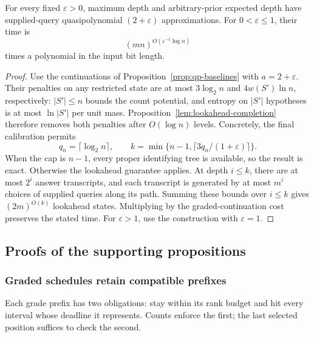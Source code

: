 \begin{theorem}\label{thm:qp-two-plus-epsilon}
For every fixed $\varepsilon>0$, maximum depth and
arbitrary-prior expected depth have supplied-query quasipolynomial
$(2+\varepsilon)$ approximations. For $0<\varepsilon\le1$, their time is
\[
(mn)^{O(\varepsilon^{-1}\log n)}
\]
times a polynomial in the
input bit length.
\end{theorem}
\begin{proof}
Use the continuations of Proposition~\ref{prop:qp-baselines} with
$a=2+\varepsilon$. Their penalties on any restricted state are at
most $3\log_2n$ and $4w(S')\ln n$, respectively: $|S'|\le n$
bounds the count potential, and entropy on $|S'|$ hypotheses is at
most $\ln|S'|$ per unit mass. Proposition~\ref{lem:lookahead-completion}
therefore removes both penalties after $O(\log n)$ levels. Concretely, the
final calibration permits
\[
 q_n=\lceil\log_2n\rceil,\qquad
 k=\min\{n-1,\lceil3q_n/(1+\varepsilon)\rceil\}.
\]
When the cap is $n-1$, every proper identifying tree is available,
so the result is exact. Otherwise the lookahead guarantee applies.
At depth $i\le k$, there are at most $2^i$ answer transcripts, and
each transcript is generated by at most $m^i$ choices of supplied
queries along its path. Summing these bounds over $i\le k$ gives
$(2m)^{O(k)}$ lookahead states. Multiplying by the graded-continuation
cost preserves the stated time. For
$\varepsilon>1$, use the construction with $\varepsilon=1$.
\end{proof}

\subsection{Proofs of the supporting propositions}

\subsubsection{Graded schedules retain compatible prefixes}

Each grade prefix has two obligations: stay within its rank budget and
hit every interval whose deadline it represents. Counts enforce the
first; the last selected position suffices to check the second.

